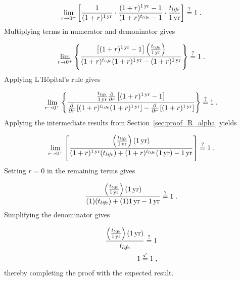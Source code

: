 \begin{equation}
  \lim_{r \to 0^+} \left[
  \frac{1}{(1 + r)^{1\,\mathrm{yr}}} \cdot
  \frac{(1 + r)^{1\,\mathrm{yr}} - 1}{(1 + r)^{t_{li\!f\!e}} - 1} \cdot
  \frac{t_{li\!f\!e}}{1\,\mathrm{yr}}
  \right] \stackrel{?}{=} 1 \; .
\end{equation}
%
Multiplying terms in numerator and demoninator gives

\begin{equation}
  \lim_{r \to 0^+} 
  \left\{
    \frac{\left[ (1 + r)^{1\,\mathrm{yr}} - 1 \right] \left( \frac{t_{li\!f\!e}}{1\,\mathrm{yr}} \right)}
    {(1 + r)^{t_{li\!f\!e}} (1 + r)^{1\,\mathrm{yr}} - (1 + r)^{1\,\mathrm{yr}}} 
  \right\} \stackrel{?}{=} 1 \; .
\end{equation}
%
Applying L'H\^{o}pital's rule gives

\begin{equation}
  \lim_{r \to 0^+} 
  \left\{
    \frac{\frac{t_{li\!f\!e}}{1\,\mathrm{yr}}
      \frac{\partial}{\partial r} 
        \left[ (1 + r)^{1\,\mathrm{yr}} - 1 \right]}
    {\frac{\partial}{\partial r} \left[ (1 + r)^{t_{li\!f\!e}} (1 + r)^{1\,\mathrm{yr}} \right] - 
     \frac{\partial}{\partial r} \left[ (1 + r)^{1\,\mathrm{yr}} \right]}
  \right\} \stackrel{?}{=} 1 \; .
\end{equation}
%
Applying the intermediate results from Section~\ref{sec:proof_R_alpha} yields

\begin{equation}
  \lim_{r \to 0^+} 
  \left[
    \frac{\left(\frac{t_{li\!f\!e}}{1\,\mathrm{yr}}\right) (1\,\mathrm{yr})}
         {(1 + r)^{1\,\mathrm{yr}} (t_{li\!f\!e}) + 
          (1 + r)^{t_{li\!f\!e}} (1\,\mathrm{yr}) - 
          1\,\mathrm{yr}}
  \right] \stackrel{?}{=} 1 \; .
\end{equation}
%
Setting $r = 0$ in the remaining terms gives

\begin{equation}
  \frac{\left( \frac{t_{li\!f\!e}}{1\,\mathrm{yr}} \right) (1\,\mathrm{yr})}
  {(1) (t_{li\!f\!e}) + (1) 1\,\mathrm{yr} - 1\,\mathrm{yr}} \stackrel{?}{=} 1 \; .
\end{equation}
%
Simplifying the denominator gives

\begin{align}
  \frac{\left( \frac{t_{li\!f\!e}}{1\,\mathrm{yr}} \right) (1\,\mathrm{yr})}
       {t_{li\!f\!e}} \stackrel{?}{=} 1 \\
       1 \stackrel{\checkmark}{=} 1 \; ,
\end{align}
%
thereby completing the proof with the expected result.
